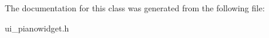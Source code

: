 The documentation for this class was generated from the following file\+:\begin{DoxyCompactItemize}
\item 
ui\+\_\+pianowidget.\+h\end{DoxyCompactItemize}
